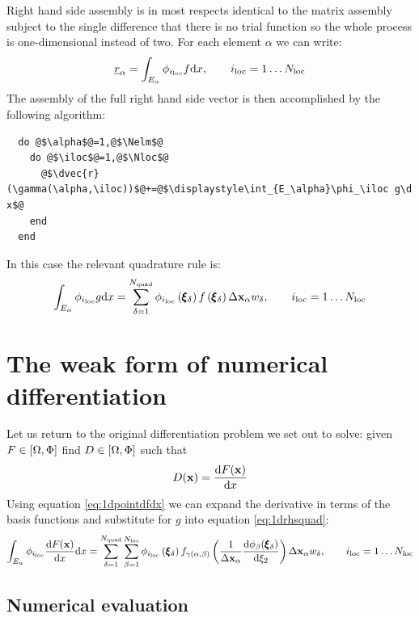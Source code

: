 \documentclass[a4paper, 11pt]{book}
\begin{document}
Right hand side assembly is in most respects identical to the matrix
assembly subject to the single difference that there is no trial function so
the whole process is one-dimensional instead of two. For each element
$\alpha$ we can write:
\begin{equation}
  \underline{r}_\alpha=\int_{E_\alpha}\phi_{i_\mathrm{loc}} f\mathrm{d} x, \qquad {i_\mathrm{loc}}=1\ldots N_\mathrm{loc}
\end{equation}
The assembly of the full right hand side vector is then accomplished by the
following algorithm:
\begin{lstlisting}
  do @$\alpha$@=1,@$\Nelm$@
    do @$\iloc$@=1,@$\Nloc$@
      @$\dvec{r}(\gamma(\alpha,\iloc))$@+=@$\displaystyle\int_{E_\alpha}\phi_\iloc g\d x$@
    end
  end
\end{lstlisting}
In this case the relevant quadrature rule is:
\begin{equation}\label{eq:1drhsquad}
  \int_{E_\alpha} \phi_{i_\mathrm{loc}} g \mathrm{d} x=
  \sum_{\delta=1}^{N_\mathrm{quad}} 
  \phi_{{i_\mathrm{loc}}}\left(\pmb{\xi}_\delta\right)f\left(\pmb{\xi}_\delta\right)\Delta\mathbf{x}_\alpha w_\delta
  , \qquad {i_\mathrm{loc}}=1\ldots N_\mathrm{loc}
\end{equation}

\section{The weak form of numerical differentiation}

Let us return to the original differentiation problem we set out to solve:
given $F\in[\Omega,\Phi]$ find $D\in[\Omega,\Phi]$ such that
\begin{equation}\label{eq:1d_derivative_again}
  D(\mathbf{x})=\frac{\mathrm{d} F(\mathbf{x})}{\mathrm{d} x}
\end{equation}
Using equation \eqref{eq:1dpointdfdx} we can expand the derivative in terms of the
basis functions and substitute for $g$ into equation \eqref{eq:1drhsquad}:
\begin{equation}\label{eq:1ddfdxrhs}
  \int_{E_\alpha} \phi_{i_\mathrm{loc}} \frac{\mathrm{d} F(\mathbf{x})}{\mathrm{d} x} \mathrm{d} x=
  \sum_{\delta=1}^{N_\mathrm{quad}}\sum_{\beta=1}^{N_\mathrm{loc}} 
  \phi_{{i_\mathrm{loc}}}\left(\pmb{\xi}_\delta\right)
  f_{\gamma(\alpha,\beta)}\left(\frac{1}{\Delta\mathbf{x}_\alpha}
    \frac{\mathrm{d} \phi_{\beta}(\pmb{\xi}_\delta)}{\mathrm{d} \xi_2}\right)    
  \Delta\mathbf{x}_\alpha w_\delta, \qquad {i_\mathrm{loc}}=1\ldots N_\mathrm{loc}
\end{equation}

\subsection{Numerical evaluation}
\end{document}
